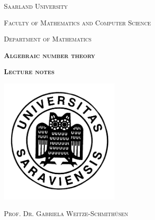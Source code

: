 \documentclass[a4paper, fontsize=11pt]{scrartcl}
\begin{document}
\pagestyle{empty}
\begin{center}

{\scshape\large Saarland University}

\smallskip
{\scshape\large Faculty of Mathematics and Computer Science}

\smallskip
{\scshape\large Department of Mathematics}

\vspace{16mm}

{\scshape\Huge\bfseries Algebraic number theory
}

\vspace{8mm}


{\scshape\bfseries\LARGE Lecture notes}


\vfill
\centerline{\mbox{\includegraphics[width=60mm]{../img/universitas.png}}}

\vfill




\vspace{15mm}


{\scshape\huge Prof. Dr. Gabriela Weitze-Schmithüsen}


\vfill


\end{center}
\end{document}
